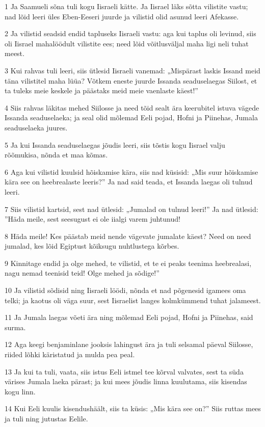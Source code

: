 \par 1 Ja Saamueli sõna tuli kogu Iisraeli kätte. Ja Iisrael läks sõtta vilistite vastu; nad lõid leeri üles Eben-Eeseri juurde ja vilistid olid asunud leeri Afekasse.
\par 2 Ja vilistid seadsid endid tapluseks Iisraeli vastu: aga kui taplus oli levinud, siis oli Iisrael mahalöödult vilistite ees; need lõid võitlusväljal maha ligi neli tuhat meest.
\par 3 Kui rahvas tuli leeri, siis ütlesid Iisraeli vanemad: „Mispärast laskis Issand meid täna vilistitel maha lüüa? Võtkem eneste juurde Issanda seaduselaegas Siilost, et ta tuleks meie keskele ja päästaks meid meie vaenlaste käest!”
\par 4 Siis rahvas läkitas mehed Siilosse ja need tõid sealt ära keerubitel istuva vägede Issanda seaduselaeka; ja seal olid mõlemad Eeli pojad, Hofni ja Piinehas, Jumala seaduselaeka juures.
\par 5 Ja kui Issanda seaduselaegas jõudis leeri, siis tõstis kogu Iisrael valju rõõmukisa, nõnda et maa kõmas.
\par 6 Aga kui vilistid kuulsid hõiskamise kära, siis nad küsisid: „Mis suur hõiskamise kära see on heebrealaste leeris?” Ja nad said teada, et Issanda laegas oli tulnud leeri.
\par 7 Siis vilistid kartsid, sest nad ütlesid: „Jumalad on tulnud leeri!” Ja nad ütlesid: ”Häda meile, sest seesugust ei ole iialgi varem juhtunud!
\par 8 Häda meile! Kes päästab meid nende vägevate jumalate käest? Need on need jumalad, kes lõid Egiptust kõiksugu nuhtlustega kõrbes.
\par 9 Kinnitage endid ja olge mehed, te vilistid, et te ei peaks teenima heebrealasi, nagu nemad teenisid teid! Olge mehed ja sõdige!”
\par 10 Ja vilistid sõdisid ning Iisraeli löödi, nõnda et nad põgenesid igamees oma telki; ja kaotus oli väga suur, sest Iisraelist langes kolmkümmend tuhat jalameest.
\par 11 Ja Jumala laegas võeti ära ning mõlemad Eeli pojad, Hofni ja Piinehas, said surma.
\par 12 Aga keegi benjaminlane jooksis lahingust ära ja tuli selsamal päeval Siilosse, riided lõhki käristatud ja mulda pea peal.
\par 13 Ja kui ta tuli, vaata, siis istus Eeli istmel tee kõrval valvates, sest ta süda värises Jumala laeka pärast; ja kui mees jõudis linna kuulutama, siis kisendas kogu linn.
\par 14 Kui Eeli kuulis kisendushäält, siis ta küsis: „Mis kära see on?” Siis ruttas mees ja tuli ning jutustas Eelile.
